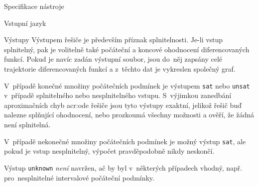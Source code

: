 \documentclass[thesis=M,czech]{FITthesis}[2012/06/26]
\newcommand{\acrlabel}[1]{acr:#1}
\newcommand{\acr}[1]{\acrshort{\acrlabel{#1}}}
\newcommand{\id}[1]{\texttt{#1}}
\newcommand{\hl}[1]{\textit{#1}}
\begin{document}
\begin{section}{Specifikace nástroje}
\begin{subsection}{Vstupní jazyk}

\end{subsection} %


\begin{subsection}{Výstupy}\label{ss:design:spec:out}
Výstupem řešiče je především příznak splnitelnosti.
Je-li vstup splnitelný,
pak je volitelně také počáteční a koncové
ohodnocení diferencovaných funkcí.
Pokud je navíc zadán výstupní soubor,
jsou do~něj zapsány celé trajektorie
diferencovaných funkcí
a z~těchto dat je vykreslen společný graf.

V~případě konečné množiny počátečních podmínek
je výstupem \id{sat} nebo \id{unsat}
v~případě splnitelného nebo nesplnitelného vstupu.
S~výjimkou zanedbání aproximačních chyb \acr{ode} řešiče
jsou tyto výstupy exaktní,
jelikož řešič buď nalezne splňující ohodnocení,
nebo prozkoumá všechny možnosti a ověří, že žádná není splnitelná.

V~případě nekonečné množiny počátečních podmínek
je možný výstup \id{sat},
ale pokud je vstup nesplnitelný,
výpočet pravděpodobně nikdy neskončí.

Výstup \id{unknown} \hl{není} navržen,
ač by byl v~některých případech vhodný,
např. pro~nesplnitelné intervalové počáteční podmínky.
\end{subsection} %


\end{section} %

\end{document}
